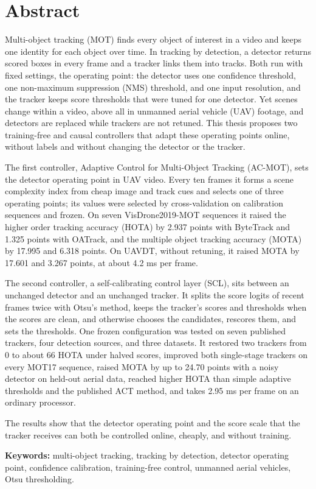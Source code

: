 \chapter*{Abstract}

Multi-object tracking (MOT) finds every object of interest in a video and keeps one identity for each object over time. In tracking by detection, a detector returns scored boxes in every frame and a tracker links them into tracks. Both run with fixed settings, the operating point: the detector uses one confidence threshold, one non-maximum suppression (NMS) threshold, and one input resolution, and the tracker keeps score thresholds that were tuned for one detector. Yet scenes change within a video, above all in unmanned aerial vehicle (UAV) footage, and detectors are replaced while trackers are not retuned. This thesis proposes two training-free and causal controllers that adapt these operating points online, without labels and without changing the detector or the tracker.

The first controller, Adaptive Control for Multi-Object Tracking (AC-MOT), sets the detector operating point in UAV video. Every ten frames it forms a scene complexity index from cheap image and track cues and selects one of three operating points; its values were selected by cross-validation on calibration sequences and frozen. On seven VisDrone2019-MOT sequences it raised the higher order tracking accuracy (HOTA) by 2.937 points with ByteTrack and 1.325 points with OATrack, and the multiple object tracking accuracy (MOTA) by 17.995 and 6.318 points. On UAVDT, without retuning, it raised MOTA by 17.601 and 3.267 points, at about 4.2 ms per frame.

The second controller, a self-calibrating control layer (SCL), sits between an unchanged detector and an unchanged tracker. It splits the score logits of recent frames twice with Otsu's method, keeps the tracker's scores and thresholds when the scores are clean, and otherwise chooses the candidates, rescores them, and sets the thresholds. One frozen configuration was tested on seven published trackers, four detection sources, and three datasets. It restored two trackers from 0 to about 66 HOTA under halved scores, improved both single-stage trackers on every MOT17 sequence, raised MOTA by up to 24.70 points with a noisy detector on held-out aerial data, reached higher HOTA than simple adaptive thresholds and the published ACT method, and takes 2.95 ms per frame on an ordinary processor.

The results show that the detector operating point and the score scale that the tracker receives can both be controlled online, cheaply, and without training.

\vspace{0.5cm}
\noindent\textbf{Keywords:} multi-object tracking, tracking by detection, detector operating point, confidence calibration, training-free control, unmanned aerial vehicles, Otsu thresholding.
